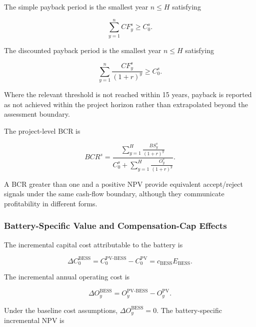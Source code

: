 The simple payback period is the smallest year $n\leq H$ satisfying

\begin{equation}
\sum_{y=1}^{n}CF_y^{s}\geq C_0^{s}.
\label{eq:ch5_simple_payback}
\end{equation}

The discounted payback period is the smallest year $n\leq H$ satisfying

\begin{equation}
\sum_{y=1}^{n}\frac{CF_y^{s}}{(1+r)^y}\geq C_0^{s}.
\label{eq:ch5_discounted_payback}
\end{equation}

Where the relevant threshold is not reached within 15 years, payback is reported as not achieved within the project horizon rather than extrapolated beyond the assessment boundary.

The project-level BCR is

\begin{equation}
BCR^{s}=
\frac{\displaystyle\sum_{y=1}^{H}\frac{BS_y^{s}}{(1+r)^y}}
{\displaystyle C_0^{s}+\sum_{y=1}^{H}\frac{O_y^{s}}{(1+r)^y}}.
\label{eq:ch5_project_bcr}
\end{equation}

A BCR greater than one and a positive NPV provide equivalent accept/reject signals under the same cash-flow boundary, although they communicate profitability in different forms.

\subsubsection{Battery-Specific Value and Compensation-Cap Effects}
\label{sec:ch5_battery_value}

The incremental capital cost attributable to the battery is

\begin{equation}
\Delta C_0^{\mathrm{BESS}}
=C_0^{\mathrm{PV\mbox{-}BESS}}-C_0^{\mathrm{PV}}
=c_{\mathrm{BESS}}E_{\mathrm{BESS}}.
\label{eq:ch5_incremental_bess_capex}
\end{equation}

The incremental annual operating cost is

\begin{equation}
\Delta O_y^{\mathrm{BESS}}
=O_y^{\mathrm{PV\mbox{-}BESS}}-O_y^{\mathrm{PV}}.
\label{eq:ch5_incremental_bess_opex}
\end{equation}

Under the baseline cost assumptions, $\Delta O_y^{\mathrm{BESS}}=0$. The battery-specific incremental NPV is

